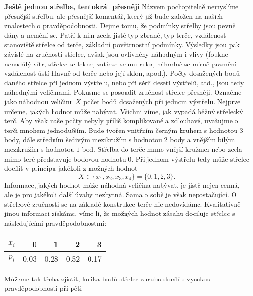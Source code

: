 \wikitextrule
\begin{example}\label{mai:exam064}
  \textbf{Ještě jednou střelba, tentokrát přesněji}\newline\small
  Názvem pochopitelně nemyslíme přesnější střelbu, ale přesnější komentář, který již bude založen 
  na našich znalostech o pravděpodobnosti. Dejme tomu, že podmínky střelby jsou pevně dány a nemění 
  se. Patří k nim zcela jistě typ zbraně, typ terče, vzdálenost stanoviště střelce od terče, 
  základní povětrnostní podmínky. Výsledky jsou pak závislé na zručnosti střelce, avšak jsou 
  ovlivněny náhodným i vlivy (foukne nenadálý vítr, střelec se lekne, zatřese se mu ruka, náhodně 
  se mírně pozmění vzdálenost ústí hlavně od terče nebo její sklon, apod.). Počty dosažených bodů 
  daného střelce při jednom výstřelu, nebo při sérii deseti výstřelů, atd., jsou tedy náhodnými
  veličinami. Pokusme se posoudit zručnost střelce přesněji. Označme jako náhodnou veličinu \(X\) 
  počet bodů dosažených při jednom výstřelu. Nejprve určeme, jakých hodnot může nabývat. Všichni 
  víme, jak vypadá běžný střelecký terč. Aby však naše počty nebyly příliš komplikované a 
  zdlouhavé, uvažujme o terči mnohem jednodušším. Bude tvořen vnitřním černým kruhem s hodnotou 
  \(3\) body, dále středním šedivým mezikružím s hodnotou \(2\) body a vnějším bílým mezikružím s 
  hodnotou \(1\) bod. Střelba do terče mimo vnější kružnici nebo zcela mimo terč představuje 
  bodovou hodnotu \(0\). Při jednom výstřelu tedy může střelec docílit v principu jakékoli z 
  možných hodnot
  \begin{equation*}
    X\in\{x_1, x_2, x_3,x_4\} = \{0,1,2,3\}.
  \end{equation*}
  Informace, jakých hodnot může náhodná veličina nabývat, je jistě nejen cenná, ale je pro jakékoli 
  další úvahy nezbytná. Sama o sobě je však nepostačující. O střelcově zručnosti se na základě 
  konstrukce terče nic nedovídáme. Kvalitativně jinou informaci získáme, víme-li, že možných hodnot 
  zásahu dociluje střelec s následujícími pravděpodobnostmi:
  \begin{table}[ht!]
    \centering
    \begin{tabular}{c|rrrr}
      \(x_i\)    &      0     &      1     &      2     &      3       \\ \hline
      \(p_i\)    & \num{0.03} & \num{0.28} & \num{0.52} & \num{0.17} 
    \end{tabular}
  \end{table}
  Můžeme tak třeba zjistit, kolika bodů střelec zhruba docílí s vysokou pravděpodobností při pěti 

\end{example}
